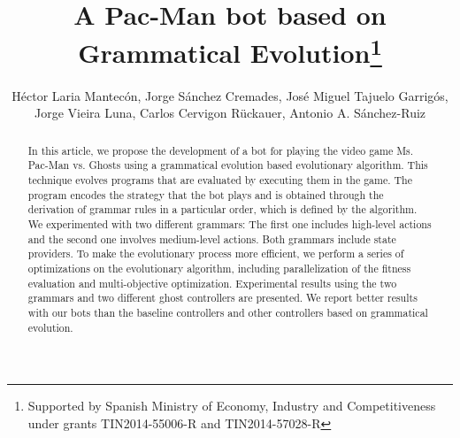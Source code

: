 \documentclass{llncs}
\title{A Pac-Man bot based on Grammatical Evolution\thanks{Supported by Spanish Ministry of Economy, Industry and Competitiveness under grants TIN2014-55006-R and TIN2014-57028-R}
}
\author{Héctor Laria Mantecón, Jorge Sánchez Cremades, José Miguel Tajuelo Garrigós, Jorge Vieira Luna, Carlos Cervigon Rückauer, Antonio A. S\'{a}nchez-Ruiz}
\institute{
	Dep. Ingenier\'{\i}a del Software e Inteligencia Artificial \\
	Universidad Complutense de Madrid (Spain) \\
	\email{\{hlaria, jorsan06, jtajuelo, jovieira, ccervigon, antsanch\}@ucm.es}
}
\newcommand{\pacman}{Ms. Pac-Man vs. Ghosts }
\begin{document}
\maketitle
%
%
\begin{abstract}
In this article, we propose the development of a bot for playing the video game \pacman using a grammatical evolution based evolutionary algorithm. This technique evolves programs that are evaluated by executing them in the game. The program encodes the strategy that the bot plays and is obtained through the derivation of grammar rules in a particular order, which is defined by the algorithm.
We experimented with two different grammars: The first one includes high-level actions and the second one involves medium-level actions. Both grammars include state providers. To make the evolutionary process more efficient, we perform a series of optimizations on the evolutionary algorithm, including parallelization of the fitness evaluation and multi-objective optimization.
Experimental results using the two grammars and two different ghost controllers  are presented. We report better results with our bots than the baseline controllers and other controllers based on grammatical evolution.





\end{abstract}
\end{document}

